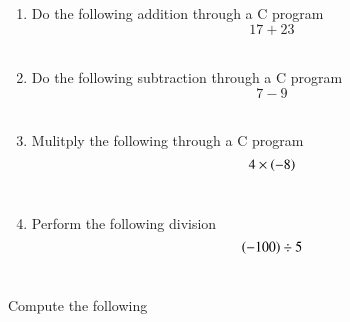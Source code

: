 \begin{enumerate}[label=\thesection.\arabic*, ref=\thesection.\theenumi]
\item Do the following addition through a C program
	$$17+23$$
	\\
	\solution
	
\item Do the following subtraction through a C program
$$7-9$$
	\\
	\solution
	
\item Mulitply the following through a C program
	$$4\times \left(-8\right)$$
	\\
	\solution
	
\item Perform the following division
	$$\left(-100\right)\div 5$$
	\\
	\solution
	
\end{enumerate}
Compute the following
